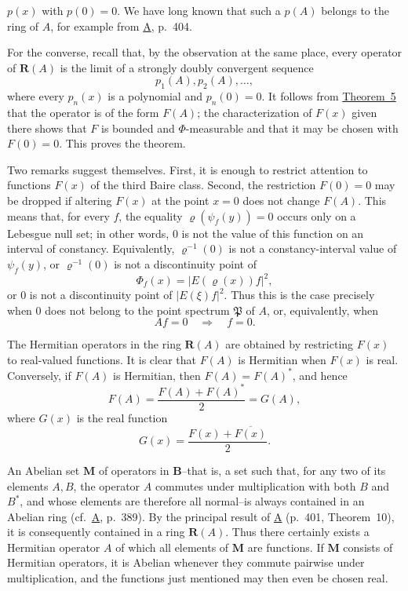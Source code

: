 \documentclass[12pt,b5paper,twoside]{article}
\begin{document}
\(p(x)\) with \(p(0)=0\).  We have long known that such a \(p(A)\) belongs
to the ring of \(A\), for example from \hyperref[ref:A]{A}, p.~404.

For the converse, recall that, by the observation at the same place,
every operator of \(\mathbf R(A)\) is the limit of a strongly doubly
convergent sequence
\[
 p_1(A),p_2(A),\ldots,
\]
where every \(p_n(x)\) is a polynomial and \(p_n(0)=0\).  It follows from
\hyperref[thm:5]{Theorem~5} that the operator is of the form \(F(A)\); the
characterization of \(F(x)\) given there shows that \(F\) is bounded and
\(\Phi\)-measurable and that it may be chosen with \(F(0)=0\).  This proves
the theorem.

Two remarks suggest themselves.  First, it is enough to restrict attention
to functions \(F(x)\) of the third Baire class.  Second, the restriction
\(F(0)=0\) may be dropped if altering \(F(x)\) at the point \(x=0\) does
not change \(F(A)\).  This means that, for every \(f\), the equality
\(\varrho(\psi_f(y))=0\) occurs only on a Lebesgue null set; in other words,
\(0\) is not the value of this function on an interval of constancy.
Equivalently, \(\varrho^{-1}(0)\) is not a constancy-interval value of
\(\psi_f(y)\), or \(\varrho^{-1}(0)\) is not a discontinuity point of
\[
 \Phi_f(x)=|E(\varrho(x))f|^2,
\]
or \(0\) is not a discontinuity point of \(|E(\xi)f|^2\).  Thus this is
the case precisely when \(0\) does not belong to the point spectrum
\(\mathfrak P\) of \(A\), or, equivalently, when
\[
 Af=0\quad\Longrightarrow\quad f=0.
\]

The Hermitian operators in the ring \(\mathbf R(A)\) are obtained by
restricting \(F(x)\) to real-valued functions.  It is clear that \(F(A)\)
is Hermitian when \(F(x)\) is real.  Conversely, if \(F(A)\) is Hermitian,
then \(F(A)=F(A)^*\), and hence
\[
 F(A)=\frac{F(A)+F(A)^*}{2}=G(A),
\]
where \(G(x)\) is the real function
\[
 G(x)=\frac{F(x)+\overline{F(x)}}{2}.
\]

An Abelian set \(\mathbf M\) of operators in \(\mathbf B\)--that is, a
set such that, for any two of its elements \(A,B\), the operator \(A\)
commutes under multiplication with both \(B\) and \(B^*\), and whose
elements are therefore all normal--is always contained in an Abelian ring
(cf.\ \hyperref[ref:A]{A}, p.~389).  By the principal result of
\hyperref[ref:A]{A} (p.~401, Theorem~10), it is consequently contained in
a ring \(\mathbf R(A)\).  Thus there certainly exists a Hermitian operator
\(A\) of which all elements of \(\mathbf M\) are functions.  If
\(\mathbf M\) consists of Hermitian operators, it is Abelian whenever
they commute pairwise under multiplication, and the functions just
mentioned may then even be chosen real.
\end{document}

